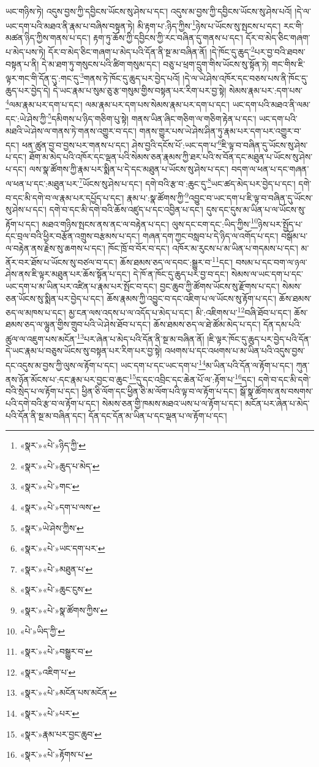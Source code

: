 ཡང་གཉིས་ཏེ། འདུས་བྱས་ཀྱི་དབྱིངས་ཡོངས་སུ་ཤེས་པ་དང་། འདུས་མ་བྱས་ཀྱི་དབྱིངས་ཡོངས་སུ་ཤེས་པའོ། །དེ་ལ་ཡང་དག་པའི་མཐའ་ནི་རྣམ་པ་བཞིས་བསྟན་ཏེ། མི་རྟག་པ་:ཉིད་ཀྱིས་\footnote{«སྣར་»«པེ་»ཉིད་ཀྱི་}ཉེས་པ་ཡོངས་སུ་སྤངས་པ་དང་། རང་གི་མཚན་ཉིད་ཀྱིས་གནས་པ་དང་། རྟག་ཏུ་ཆོས་ཀྱི་དབྱིངས་ཀྱི་རང་བཞིན་དུ་གནས་པ་དང་། དོར་བ་མེད་ཅིང་གཞག་པ་མེད་པས་ཏེ། དོར་བ་མེད་ཅིང་གཞག་པ་མེད་པའི་དོན་ནི་སྔ་མ་བཞིན་ནོ། །དེ་ཁོང་དུ་ཆུད་\footnote{«སྣར་»«པེ་»ཆུད་པ་མེད་}པར་བྱ་བའི་ཐབས་བསྟན་པ་ནི། དེ་མ་ཐག་ཏུ་གསུངས་པའི་ཚིག་གསུམ་དང་། བཅུ་པ་ཕྲག་དྲུག་གིས་ཡོངས་སུ་སྟོན་ཏེ། གང་གིས་ཇི་ལྟར་གང་གི་དོན་དུ་:གང་དུ་\footnote{«སྣར་»«པེ་»གང་}གནས་ཏེ་ཁོང་དུ་ཆུད་པར་བྱེད་པའོ། །དེ་ལ་ཡེ་ཤེས་འཁོར་དང་བཅས་པས་ནི་ཁོང་དུ་ཆུད་པར་བྱེད་དེ། དེ་ཡང་རྣམ་པ་སུམ་ཅུ་རྩ་གསུམ་གྱིས་བསྟན་པར་རིག་པར་བྱ་སྟེ། སེམས་རྣམ་པར་:དག་པས་\footnote{«སྣར་»«པེ་»དག་པ་ལས་}ལམ་རྣམ་པར་དག་པ་དང་། ལམ་རྣམ་པར་དག་པས་སེམས་རྣམ་པར་དག་པ་དང་། ཡང་དག་པའི་མཐའ་ནི་ལམ་དང་:ཡེ་ཤེས་ཀྱི་\footnote{«སྣར་»ཡེ་ཤེས་ཀྱིས་}དམིགས་པ་ཉིད་གཅིག་པུ་སྟེ། གནས་ཡིན་ཞིང་གཅིག་ལ་གཅིག་རྟེན་པ་དང་། ཡང་དག་པའི་མཐའི་ཡེ་ཤེས་ལ་གནས་ཏེ་གནས་འགྱུར་བ་དང་། གནས་གྱུར་པས་ཡེ་ཤེས་ཤིན་ཏུ་རྣམ་པར་དག་པར་འགྱུར་བ་དང་། ཕན་ཚུན་བྱ་བ་བྱས་པར་གནས་པ་དང་། ཤེས་བྱའི་དངོས་པོ་:ཡང་དག་པ་\footnote{«སྣར་»«པེ་»ཡང་དག་པར་}ཇི་ལྟ་བ་བཞིན་དུ་ཡོངས་སུ་ཤེས་པ་དང་། ཐོག་མ་མེད་པའི་འཁོར་དང་ལྡན་པའི་སེམས་ཅན་རྣམས་ཀྱི་ཐར་པའི་ས་བོན་དང་མཐུན་པ་ཡོངས་སུ་ཤེས་པ་དང་། ལས་སྣ་ཚོགས་ཀྱི་རྣམ་པར་སྨིན་པ་དེ་དང་མཐུན་པ་ཡོངས་སུ་ཤེས་པ་དང་། བདག་ལ་ཕན་པ་དང་གཞན་ལ་ཕན་པ་དང་:མཐུན་པར་\footnote{«སྣར་»«པེ་»མཐུན་པ་}ཡོངས་སུ་ཤེས་པ་དང་། དགེ་བའི་རྩ་བ་:ཆུང་དུ་\footnote{«སྣར་»«པེ་»ཆུང་ངུས་}ཡང་ཚད་མེད་པར་བྱེད་པ་དང་། དགེ་བ་དང་མི་དགེ་བ་ལ་རྣམ་པར་དཔྱོད་པ་དང་། རྣམ་པ་:སྣ་ཚོགས་ཀྱི་\footnote{«སྣར་»«པེ་»སྣ་ཚོགས་ཀྱིས་}འབྱུང་བ་ཡང་དག་པ་ཇི་ལྟ་བ་བཞིན་དུ་ཡོངས་སུ་ཤེས་པ་དང་། དགེ་བ་དང་མི་དགེ་བའི་ཆོས་འཛུད་པ་དང་འབྱིན་པ་དང་། དུས་དང་དུས་མ་ཡིན་པ་ལ་ཡོངས་སུ་རྟོག་པ་དང་། མཐའ་གཉིས་སྤངས་ནས་ནང་ལ་བརྟེན་པ་དང་། ལུས་དང་ངག་དང་:ཡིད་ཀྱིས་\footnote{«པེ་»ཡིད་ཀྱི་}ཉེས་པར་སྤྱོད་པ་དང་བྲལ་བའི་ཕྱིར་བརྩོན་འགྲུས་བརྩམས་པ་དང་། གཞན་དག་ཀྱང་བསླབ་པ་དེ་ཉིད་ལ་འགོད་པ་དང་། བསྒོམ་པ་ལ་བརྟེན་ནས་རྗེས་སུ་ཆགས་པ་དང་། ཁོང་ཁྲོ་བ་བོར་བ་དང་། འཁོར་མ་རུངས་པ་མ་ཡིན་པ་གདམས་པ་དང་། མ་ནོར་བར་ཐོས་པ་ཡོངས་སུ་བཙལ་བ་དང་། ཆོས་ཐམས་ཅད་ལ་དབང་:སྒྱུར་བ་\footnote{«སྣར་»«པེ་»བསྒྱུར་བ་}དང་། བསམ་པ་དང་བག་ལ་ཉལ་ཤེས་ནས་ཇི་ལྟར་མཐུན་པར་ཆོས་སྟོན་པ་དང་། དེ་ཁོ་ན་ཁོང་དུ་ཆུད་པར་བྱ་བ་དང་། སེམས་ལ་ཡང་དག་པ་དང་ཡང་དག་པ་མ་ཡིན་པར་འཛིན་པ་རྣམ་པར་སྤོང་བ་དང་། བྱང་ཆུབ་ཀྱི་ཚོགས་ཡོངས་སུ་རྫོགས་པ་དང་། སེམས་ཅན་ཡོངས་སུ་སྨིན་པར་བྱེད་པ་དང་། ཆོས་རྣམས་ཀྱི་འབྱུང་བ་དང་འཇིག་པ་ལ་ཡོངས་སུ་རྟོག་པ་དང་། ཆོས་ཐམས་ཅད་ལ་མཁས་པ་དང་། མྱ་ངན་ལས་འདས་པ་ལ་འདོད་པ་མེད་པ་དང་། མི་:འཇིགས་པ་\footnote{«སྣར་»འཇིག་པ་}བཞི་ཐོབ་པ་དང་། ཆོས་ཐམས་ཅད་ལ་ལྷུན་གྱིས་གྲུབ་པའི་ཡེ་ཤེས་ཐོབ་པ་དང་། ཆོས་ཐམས་ཅད་ལ་ཐེ་ཚོམ་མེད་པ་དང་། དོན་དམ་པའི་ཚུལ་ལ་འཇུག་པས་མངོན་\footnote{«སྣར་»«པེ་»མངོན་པས་མངོན་}པར་ཞེན་པ་མེད་པའི་དོན་ནི་སྔ་མ་བཞིན་ནོ། །ཇི་ལྟར་ཁོང་དུ་ཆུད་པར་བྱེད་པའི་དོན་དེ་ཡང་རྣམ་པ་བཅུས་ཡོངས་སུ་བསྟན་པར་རིག་པར་བྱ་སྟེ། འཕགས་པ་དང་འཕགས་པ་མ་ཡིན་པའི་འདུས་བྱས་དང་འདུས་མ་བྱས་ཀྱི་ལུས་ལ་རྟོག་པ་དང་། ཡང་དག་པ་དང་ཡང་དག་པ་\footnote{«སྣར་»«པེ་»པར་}མ་ཡིན་པའི་དོན་ལ་རྟོག་པ་དང་། ཀུན་ནས་ཉོན་མོངས་པ་:དང་རྣམ་པར་བྱང་བ་ཆུང་\footnote{«སྣར་»རྣམ་པར་བྱང་ཆུབ་}དུ་དང་འབྲིང་དང་ཆེན་པོ་ལ་:རྟོག་པ་\footnote{«སྣར་»«པེ་»རྟོགས་པ་}དང་། དགེ་བ་དང་མི་དགེ་བའི་སྲེད་པ་ལ་རྟོག་པ་དང་། ཕྱིན་ཅི་ལོག་དང་ཕྱིན་ཅི་མ་ལོག་པའི་ལྟ་བ་ལ་རྟོག་པ་དང་། སྒོ་སྣ་ཚོགས་ནས་བསགས་པའི་དགེ་བའི་རྩ་བ་ལ་རྟོག་པ་དང་། སེམས་ཅན་གྱི་ཁམས་མཐའ་ཡས་པ་ལ་རྟོག་པ་དང་། མངོན་པར་ཞེན་པ་མེད་པའི་དོན་ནི་སྔ་མ་བཞིན་དང་། དོན་དང་དོན་མ་ཡིན་པ་དང་ལྡན་པ་ལ་རྟོག་པ་དང་། 